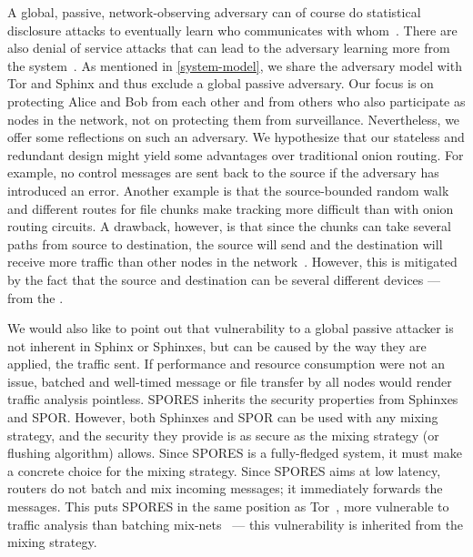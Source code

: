 A global, passive, network-observing adversary can of course do
statistical disclosure attacks to eventually learn who communicates
with whom~\cite{StatisticalDisclosureAttacks}.   There are also denial
of service attacks that can lead to the adversary learning more from
the system~\cite{DenialOfSecurity}.  As mentioned in
\cref{system-model}, we share the adversary model with Tor and Sphinx
and thus exclude a global passive adversary. Our focus is on
protecting Alice and Bob from each other and from others who also
participate as nodes in the network, not on protecting them from
surveillance. Nevertheless, we offer some reflections on such an
adversary. We hypothesize that our stateless and redundant design
might yield some advantages over traditional onion routing. For
example, no control messages are sent back to the source if the
adversary has introduced an error.     Another example is that the source-bounded
random walk and different routes for file chunks make tracking more
difficult than with onion routing circuits. A drawback, however, is
that since the chunks can take several paths from source to destination, the source 
will send and the destination will receive more traffic than other nodes in the 
network~\cite{RoutingSurveyAnonymousProtocols}. However, this is mitigated by the fact that the source and 
destination can be several different devices --- \ie from the \squads.


We would also like to point out that
vulnerability to a global passive attacker is not inherent in Sphinx
or Sphinxes, but can be caused by the way they are applied, \ie the
traffic sent. If performance and resource consumption were not an
issue, batched and well-timed message or file transfer by all nodes
would render traffic analysis pointless. \Ac{SPORES} inherits the security properties from Sphinxes and \ac{SPOR}.
However, both Sphinxes and \ac{SPOR} can be used with any mixing strategy, and 
the security they provide is as secure as the mixing strategy (or flushing 
algorithm) allows.
Since \ac{SPORES} is a fully-fledged system, it must make a concrete choice for 
the mixing strategy.
Since \ac{SPORES} aims at low latency, routers do not batch and mix incoming 
messages; it immediately forwards the messages.
This puts \ac{SPORES} in the same position as Tor~\cite{Tor}, \ie more 
vulnerable to traffic analysis than batching 
mix-nets~\cite{RoutingSurveyAnonymousProtocols}  --- this vulnerability is inherited 
from the mixing strategy.





